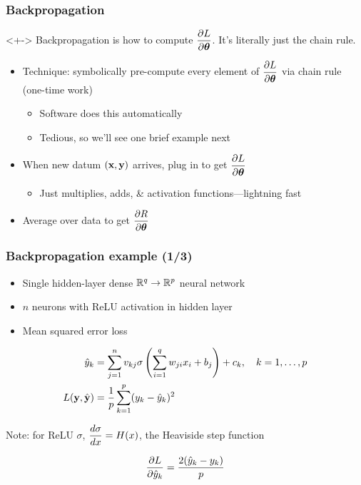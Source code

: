 \begin{frame}
    \frametitle{Backpropagation}


    \begin{block}{}<+->
        Backpropagation is how to compute $\dfrac{\partial L}{\partial \bm{\theta}}$.
        It's literally just the chain rule.
    \end{block}

    \begin{itemize}
        \item<+-> Technique: symbolically pre-compute every element of $\dfrac{\partial L}{\partial \bm{\theta}}$ via chain rule (one-time work)
        \begin{itemize}
            \item Software does this automatically
            \item Tedious, so we'll see one brief example next
        \end{itemize}
        \item<+-> When new datum $(\mathbf{x}, \mathbf{y})$ arrives, plug in to get $\dfrac{\partial L}{\partial \bm{\theta}}$
        \begin{itemize}
            \item Just multiplies, adds, \& activation functions---lightning fast
        \end{itemize}
        \item<+-> Average over data to get $\dfrac{\partial R}{\partial \bm{\theta}}$
    \end{itemize}
\end{frame}

\begin{frame}
    \frametitle{Backpropagation example (1/3)}
    \begin{itemize}
        \item Single hidden-layer dense $\mathbb{R}^q \to \mathbb{R}^p$ neural network
        \item $n$ neurons with ReLU activation in hidden layer
        \item Mean squared error loss
    \end{itemize}
    \pause

    \begin{block}{}
        \vspace{-1em}
        \begin{align*}
            \hat{y}_k &= \sum_{j=1}^n v_{kj} \sigma\left(\sum_{i=1}^q w_{ji} x_i + b_j\right) + c_k,
            \quad
            k = 1, \ldots, p \\
            L(\mathbf{y}, \hat{\mathbf{y}}) &= \frac{1}{p} \sum_{k=1}^p (y_k - \hat{y}_k)^2
        \end{align*}
    \end{block}
    \pause

    Note: for ReLU $\sigma$, $\dfrac{d \sigma}{d x} = H(x)$, the Heaviside step function

    \begin{equation*}
        \dfrac{\partial L}{\partial \hat{y}_k} = \frac{2 (\hat{y}_k - y_k)}{p}
    \end{equation*}
\end{frame}

